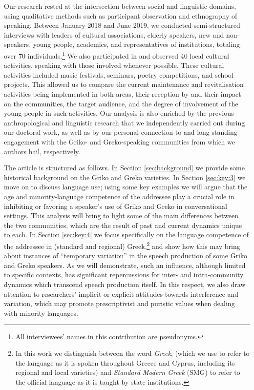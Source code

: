 \documentclass[output=paper,hidelinks]{langscibook}
\begin{document}
Our research rested at the intersection between social and linguistic domains, using qualitative methods such as participant observation and ethnography of speaking. Between January 2018 and June 2019, we conducted semi-structured interviews with leaders of cultural associations, elderly speakers, new and non-speakers, young people, academics, and representatives of institutions, totaling over 70 individuals.\footnote{All interviewees’ names in this contribution are pseudonyms.} We also participated in and observed 40 local cultural activities, speaking with those involved whenever possible. These cultural activities included music festivals, seminars, poetry competitions, and school projects. This allowed us to compare the current maintenance and revitalisation activities being implemented in both areas, their reception by and their impact on the communities, the target audience, and the degree of involvement of the young people in such activities. Our analysis is also enriched by the previous anthropological and linguistic research that we independently carried out during our doctoral work, as well as by our personal connection to and long-standing engagement with the Griko- and Greko-speaking communities from which we authors hail, respectively.



The article is structured as follows. In Section \ref{sec:background} we provide some historical background on the Griko and Greko varieties. In Section \ref{sec:key:3} we move on to discuss language use; using some key examples we will argue that the age and minority-language competence of the addressee play a crucial role in inhibiting or favoring a speaker’s use of Griko and Greko in conversational settings. This analysis will bring to light some of the main differences between the two communities, which are the result of past and current dynamics unique to each. In Section \ref{sec:key:4} we focus specifically on the language competence of the addressee in (standard and regional) Greek,\footnote{In this work we distinguish between the word \textit{Greek}, (which we use to refer to the language as it is spoken throughout Greece and Cyprus, including its regional and local varieties) and \textit{Standard Modern Greek} (SMG) to refer to the official language as it is taught by state institutions.} and show how this may bring about instances of ``temporary variation'' in the speech production of some Griko and Greko speakers. As we will demonstrate, such an influence, although limited to specific contexts, has significant repercussions for inter- and intra-community dynamics which transcend speech production itself. In this respect, we also draw attention to researchers’ implicit or explicit attitudes towards interference and variation, which may promote prescriptivist and puristic values when dealing with minority languages.
\end{document}
